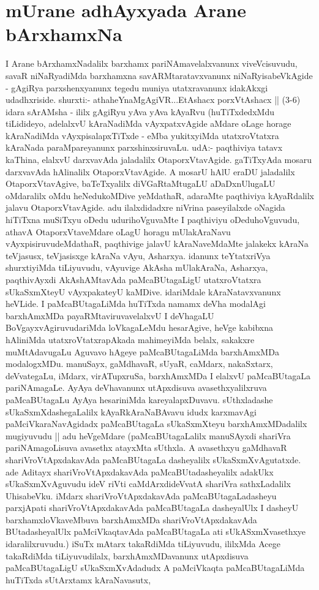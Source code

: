 
\section*{mUrane adhAyxyada Arane bArxhamxNa}


\begin{artha}
I Arane bArxhamxNadalilx barxhamx pariNAmavelalxvanunx viveVcisuvudu, savaR niNaRyadiMda barxhamxna savARMtaratavxvanunx niNaRyisabeVkAgide - gAgiRya parxshenxyanunx tegedu muniya utatxravanunx idakAkxgi udadhxriside. shurxti:- athaheYnaMgAgiVR...EtAshacx porxVtAshacx || (3-6) idara sArAMsha - ililx gAgiRyu yAva yAva kAyaRvu (huTiTxdedxMdu tiLidideyo, adelalxvU kAraNadiMda vAyxpatxvAgide aMdare oLage horage kAraNadiMda vAyxpisalapxTiTxde - eMba yukitxyiMda utatxroVtatxra kAraNada paraMpareyanunx parxshinxsiruvaLu. udA:- paqthiviya tatavx kaThina, elalxvU darxvavAda jaladalilx OtaporxVtavAgide. gaTiTxyAda mosaru darxvavAda hAlinalilx OtaporxVtavAgide. A mosarU hAlU eraDU jaladalilx OtaporxVtavAgive, baTeTxyalilx diVGaRtaMtugaLU aDaDxnUlugaLU oMdaralilx oMdu heNedukoMDive yeMdathaR, adaraMte paqthiviya kAyaRdalilx jalavu OtaporxVtavAgide. adu ilalxdidadxre niVrina paseyilalxde oNagida hiTiTxna muSiTxyu oDedu udurihoVguvaMte I paqthiviyu oDeduhoVguvudu, athavA OtaporxVtaveMdare oLagU horagu mUlakAraNavu vAyxpisiruvudeMdathaR, paqthivige jalavU kAraNaveMdaMte jalakekx kAraNa teVjasusx, teVjasisxge kAraNa vAyu, Asharxya. idanunx teYtatxriVya shurxtiyiMda tiLiyuvudu, vAyuvige AkAsha mUlakAraNa, Asharxya, paqthivAyxdi AkAshAMtavAda paMcaBUtagaLigU utatxroVtatxra sUkaSxmXteyU vAyxpakateyU kaMDive. idariMdale kAraNatavxvanunx heVLide. I paMcaBUtagaLiMda huTiTxda namamx deVha modalAgi barxhAmxMDa payaRMtaviruvavelalxvU I deVhagaLU BoVgayxvAgiruvudariMda loVkagaLeMdu hesarAgive, heVge kabibxna hAliniMda utatxroVtatxrapAkada mahimeyiMda belalx, sakakxre muMtAdavugaLu Aguvavo hAgeye paMcaBUtagaLiMda barxhAmxMDa modalogxMDu. manuSayx, gaMdhavaR, sUyaR, caMdarx, nakaSxtarx, deVvategaLu, iMdarx, virATupxruSa, barxhAmxMDa I elalxvU paMcaBUtagaLa pariNAmagaLe. AyAya deVhavanunx utApxdisuva avasethxyalilxruva paMcaBUtagaLu AyAya hesariniMda kareyalapxDuvavu. sUthxladashe sUkaSxmXdashegaLalilx kAyaRkAraNaBAvavu idudx karxmavAgi paMciVkaraNavAgidadx paMcaBUtagaLa sUkaSxmXteyu barxhAmxMDadalilx mugiyuvudu || adu  heVgeMdare \mdash  (paMcaBUtagaLalilx manuSAyxdi shariVra pariNAmagoLisuva avasethx atayxMta sUthxla. A avasethxyu gaMdhavaR shariVroVtApxdakavAda paMcaBUtagaLa dasheyalilx sUkaSxmXvAgutatxde. ade Aditayx shariVroVtApxdakavAda paMcaBUtadasheyalilx adakUkx sUkaSxmXvAguvudu ideV riVti caMdArxdideVvatA shariVra sathxLadalilx UhisabeVku. iMdarx shariVroVtApxdakavAda paMcaBUtagaLadasheyu parxjApati shariVroVtApxdakavAda paMcaBUtagaLa dasheyalUlx I dasheyU barxhamxloVkaveMbuva barxhAmxMDa shariVroVtApxdakavAda BUtadasheyalUlx paMciVkaqtavAda paMcaBUtagaLa ati sUkASxmXvasethxye idaralilxruvudu.) iSuTx mAtarx takaRdiMda tiLiyuvudu, ililxMda Acege takaRdiMda tiLiyuvudilalx, barxhAmxMDavanunx utApxdisuva paMcaBUtagaLigU sUkaSxmXvAdadudx A paMciVkaqta paMcaBUtagaLiMda huTiTxda sUtArxtamx kAraNavasutx, 
\end{artha}
